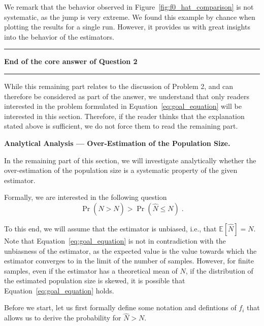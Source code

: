 \documentclass{article}
\begin{document}
We remark that the behavior observed in Figure~\ref{fig:f0_hat_comparison} is not systematic, as the jump is very extreme. We found this example by chance when plotting the results for a single run. However, it provides us with great insights into the behavior of the estimators.

\begin{center}
    \noindent\rule{0.2\linewidth}{0.4pt}
    \hspace{0.02\linewidth}
    \textbf{End of the core answer of Question 2}
    \hspace{0.02\linewidth}
    \rule{0.2\linewidth}{0.4pt}
\end{center}

While this remaining part relates to the discussion of Problem 2, and can therefore be considered as part of the answer, we understand that only readers interested in the problem formulated in Equation~\ref{eq:goal_equation} will be interested in this section. 
Therefore, if the reader thinks that the explanation stated above is sufficient, we do not force them to read the remaining part.

\textbf{Analytical Analysis --- Over-Estimation of the Population Size.}

In the remaining part of this section, we will investigate analytically whether the over-estimation of the population size is a systematic property of the given estimator.


Formally, we are interested in the following question
\begin{equation}
    \Pr(\hat{N} > N) > \Pr(\hat{N} \leq N)\;.
    \label{eq:goal_equation}
\end{equation}

To this end, we will assume that the estimator is unbiased, i.e., that $\mathbb{E}[\hat{N}] = N$. 
Note that Equation~\ref{eq:goal_equation} is not in contradiction with the unbiasness of the estimator, as the expected value is the value towards which the estimator converges to in the limit of the number of samples. However, for finite samples, even if the estimator has a theoretical mean of $N$, if the distribution of the estimated population size is skewed, it is possible that Equation~\ref{eq:goal_equation} holds. 


Before we start, let us first formally define some notation and defintions of $f_i$ that allows us to derive the probability for $\hat{N} > N$.
\end{document}
